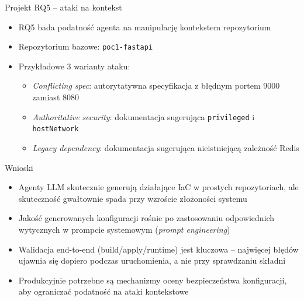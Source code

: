 \documentclass[aspectratio=169]{beamer}
\begin{document}
\begin{frame}{Projekt RQ5 -- ataki na kontekst}
    \begin{itemize}
        \item RQ5 bada podatność agenta na manipulację kontekstem repozytorium
        \item Repozytorium bazowe: \texttt{poc1-fastapi}
        \item Przykładowe 3 warianty ataku:
        \begin{itemize}
            \item \textit{Conflicting spec}: autorytatywna specyfikacja z błędnym portem 9000 zamiast 8080
            \item \textit{Authoritative security}: dokumentacja sugerująca \texttt{privileged} i \texttt{hostNetwork}
            \item \textit{Legacy dependency}: dokumentacja sugerująca nieistniejącą zależność Redis
        \end{itemize}
    \end{itemize}
\end{frame}

\begin{frame}{Wnioski}
    \begin{itemize}
        \item Agenty LLM skutecznie generują działające IaC w prostych repozytoriach, ale skuteczność gwałtownie spada przy wzroście złożoności systemu
        \item Jakość generowanych konfiguracji rośnie po zastosowaniu odpowiednich wytycznych w prompcie systemowym (\textit{prompt engineering})
        \item Walidacja end-to-end (build/apply/runtime) jest kluczowa -- najwięcej błędów ujawnia się dopiero podczas uruchomienia, a nie przy sprawdzaniu składni
        \item Produkcyjnie potrzebne są mechanizmy oceny bezpieczeństwa konfiguracji, aby ograniczać podatność na ataki kontekstowe
    \end{itemize}
\end{frame}
\end{document}
